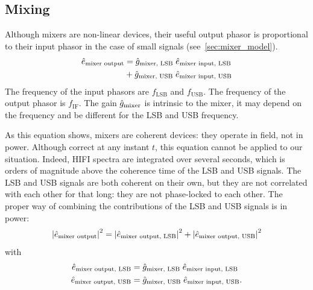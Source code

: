 
\subsection{Mixing}
Although mixers are non-linear devices, their useful output phasor is proportional to their input phasor in the case of small signals (see~\vref{sec:mixer_model}).
\begin{equation}
    \begin{aligned}
    \hat{e}_\text{mixer output}
    &=
    \hat{g}_\text{mixer, LSB} \;
    \hat{e}_\text{mixer input, LSB} \\
    &+
    \hat{g}_\text{mixer, USB} \;
    \hat{e}_\text{mixer input, USB}
    \end{aligned}
\end{equation}
The frequency of the input phasors are $f_\text{LSB}$ and $f_\text{USB}$.
The frequency of the output phasor is $f_\text{IF}$.
The gain $\hat{g}_\text{mixer}$ is intrinsic to the mixer, it may depend on the frequency and be different for the LSB and USB frequency.

As this equation shows, mixers are coherent devices: they operate in field, not in power.
Although correct at any instant $t$, this equation cannot be applied to our situation.
Indeed, HIFI spectra are integrated over several seconds, which is orders of magnitude above the coherence time of the LSB and USB signals.
The LSB and USB signals are both coherent on their own, but they are not correlated with each other for that long: they are not phase-locked to each other.
The proper way of combining the contributions of the LSB and USB signals is in power:
\begin{equation}
    \abs{\cp{e}_\text{mixer output}}^2
    =
    \abs{\cp{e}_\text{mixer output, LSB}}^2
    +
    \abs{\cp{e}_\text{mixer output, USB}}^2
\end{equation}
with
\begin{align}
    \hat{e}_\text{mixer output, LSB}
    &=
    \hat{g}_\text{mixer, LSB}
    \;
    \hat{e}_\text{mixer input, LSB}
    \\
    \hat{e}_\text{mixer output, USB}
    &=
    \hat{g}_\text{mixer, USB}
    \;
    \hat{e}_\text{mixer input, USB}
    \text{.}
\end{align}

